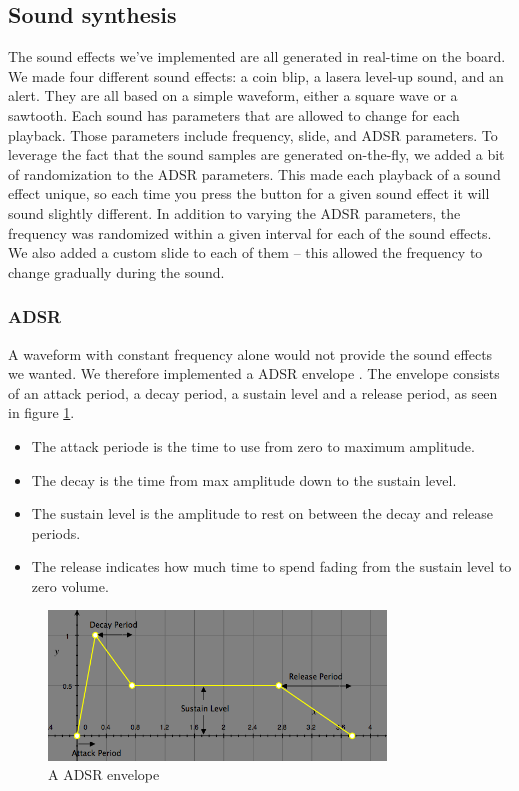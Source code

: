 \subsection{Sound synthesis}
The sound effects we've implemented are all generated in real-time on the board.
We made four different sound effects: a coin blip, a lasera level-up sound, and an alert.
They are all based on a simple waveform, either a square wave or a sawtooth.
Each sound has parameters that are allowed to change for each playback.
Those parameters include frequency, slide, and ADSR parameters.
To leverage the fact that the sound samples are generated on-the-fly, we added a bit of randomization to the ADSR parameters.
This made each playback of a sound effect unique, so each time you press the button for a given sound effect it will sound slightly different.
In addition to varying the ADSR parameters, the frequency was randomized within a given interval for each of the sound effects.
We also added a custom slide to each of them – this allowed the frequency to change gradually during the sound.

\subsubsection{ADSR}

A waveform with constant frequency alone would not provide the sound effects we wanted. We therefore implemented a ADSR envelope \cite{adsr}.
The envelope consists of an attack period, a decay period, a sustain level and a release period, as seen in figure \ref{fig:adsr_envelope}.

\begin{itemize}
    \item The attack periode is the time to use from zero to maximum amplitude.
    \item The decay is the time from max amplitude down to the sustain level.
    \item The sustain level is the amplitude to rest on between the decay and release periods.
    \item The release indicates how much time to spend fading from the sustain level to zero volume.
\end{itemize}

\begin{figure}[ht!]
    \begin{center}
    \includegraphics[width=0.8\textwidth]{assets/img/adsr.png}
    \caption{A ADSR envelope}
    \label{fig:adsr_envelope}
    \end{center}
\end{figure}

